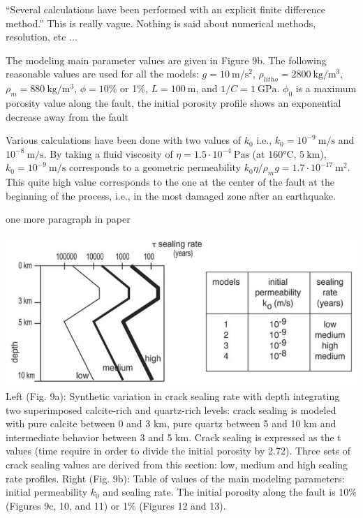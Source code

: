 ``Several calculations have been performed with an
explicit finite difference method.''
This is really vague. Nothing is said about numerical methods, 
resolution, etc ... 

The modeling main
parameter values are given in Figure 9b.
The following reasonable values are used for all the models:
$g=10~\si{\meter\per\square\second}$, $\rho_{litho}=2800~\si{\kg\per\cubic\meter}$, 
$\rho_m=880~\si{\kg\per\cubic\meter}$, $\phi=10\%$ or 1\%,
$L=100~\si{\meter}$, and $1/C=1~\si{\giga\pascal}$.
$\phi_0$ is a maximum porosity value along the fault, the initial porosity profile shows an
exponential decrease away from the fault

Various calculations have been done with two values of $k_0$
i.e., $k_0 = 10^{-9}~\si{\meter\per\second}$ and $10^{-8}~\si{\meter\per\second}$. By taking a fluid
viscosity of $\eta= 1.5 \cdot 10^{-4}~\si{\pascal\second}$ (at $160\si{\celsius}$, $5~\si{\kilo\meter}$), 
$k_0= 10^{-9}~\si{\meter\per\second}$ corresponds to a geometric permeability 
$k_0 \eta/\rho_m g =1.7 \cdot 10^{-17}~\si{\square\meter}$. This quite high value corresponds to the
one at the center of the fault at the beginning of the process,
i.e., in the most damaged zone after an earthquake.

{\color{red} one more paragraph in paper}

\begin{center}
\includegraphics[width=15cm]{python_codes/fieldstone_126/images/grfr03a}\\
{\captionfont 
Left (Fig. 9a): Synthetic variation
in crack sealing rate with depth integrating two superimposed calcite-rich and quartz-rich levels: crack
sealing is modeled with pure calcite between 0 and 3 km, pure quartz between 5 and 10 km and
intermediate behavior between 3 and 5 km. Crack sealing is expressed as the t values (time require in
order to divide the initial porosity by 2.72). Three sets of crack sealing values are derived from this
section: low, medium and high sealing rate profiles.
Right (Fig. 9b): Table of values of the main modeling parameters:
initial permeability $k_0$ and sealing rate. 
The initial porosity along the fault is 10\% (Figures 9c, 10, and 11) or 1\% (Figures 12 and 13).}
\end{center}


